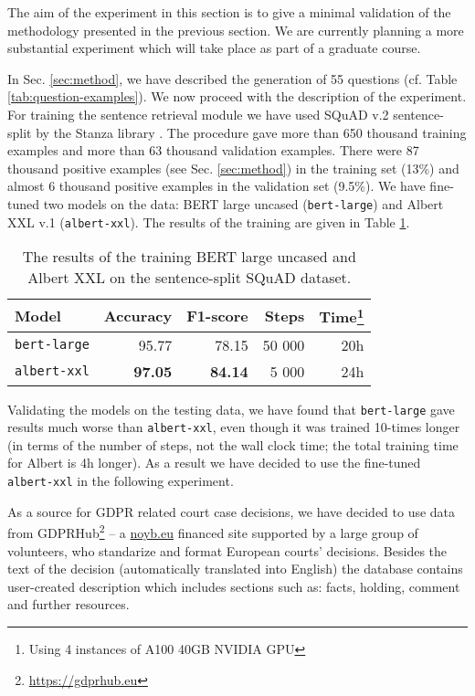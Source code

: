 The aim of the experiment in this section is to give a minimal validation of the methodology presented in the previous section. We are currently planning a more substantial experiment which will take place as part of a graduate course.

In Sec. \ref{sec:method}, we have described the generation of 55 questions (cf. Table \ref{tab:question-examples}). We now proceed with the description of the experiment.
For training the sentence retrieval module we have used SQuAD v.2 \cite{rajpurkar2018know} sentence-split by the Stanza 
library \cite{qi2020stanza}. 
The procedure gave more than 650 thousand training examples and more than 63 thousand validation examples. There were 87 thousand
positive examples (see Sec. \ref{sec:method}) in the training set (13\%) and almost 6 thousand positive examples in the validation set (9.5\%).
We have fine-tuned two models on the data: BERT large uncased \cite{devlin2018bert} (\texttt{bert-large}) and 
Albert XXL v.1 \cite{lan2019albert} (\texttt{albert-xxl}). The results of the training are given in Table \ref{tab:bert-albert}.

\begin{table}[htbp]
    \centering\begin{tabular}{l r r r r}
        \hline
        \textbf{Model} & \textbf{Accuracy} & \textbf{F1-score} & \textbf{Steps} & \textbf{Time\footnote{Using 4 instances of A100 40GB NVIDIA GPU}} \\
        \hline
        \texttt{bert-large} & 95.77 & 78.15 & 50 000 & 20h \\
        \hline
        \texttt{albert-xxl} & \textbf{97.05} & \textbf{84.14} & 5 000 & 24h \\
        \hline
    \end{tabular}
    \caption{The results of the training BERT large uncased and Albert XXL on the sentence-split SQuAD dataset.}
    \label{tab:bert-albert}
\end{table}

Validating the models on the testing data, we have found that \texttt{bert-large} gave results much worse than \texttt{albert-xxl}, even though it was trained 10-times longer 
(in terms of the number of steps, not the wall clock time; the total training time for Albert is 4h longer). 
As a result we have decided to use the fine-tuned \texttt{albert-xxl} 
in the following experiment. 

As a source for GDPR related court case decisions, we have decided to use data from GDPRHub\footnote{\url{https://gdprhub.eu}} -- a \url{noyb.eu} financed site supported by
a large group of volunteers, who standarize and format European courts' decisions. Besides the text of the decision (automatically translated into English) the database
contains user-created description which includes sections such as: facts, holding, comment and further resources.

